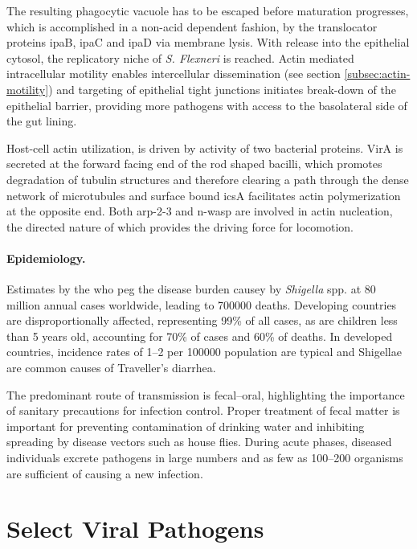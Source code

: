 The resulting phagocytic vacuole has to be escaped before maturation progresses, which is accomplished in a non-acid dependent fashion, by the translocator proteins \gls{ipa}B, \gls{ipa}C and \gls{ipa}D via membrane lysis. With release into the epithelial cytosol, the replicatory niche of \textit{S. Flexneri} is reached. Actin mediated intracellular motility enables intercellular dissemination (see section \ref{subsec:actin-motility}) and targeting of epithelial tight junctions initiates break-down of the epithelial barrier, providing more pathogens with access to the basolateral side of the gut lining.


Host-cell actin utilization, is driven by activity of two bacterial proteins. VirA is secreted at the forward facing end of the rod shaped bacilli, which promotes degradation of tubulin structures and therefore clearing a path through the dense network of microtubules and surface bound \gls{ics}A facilitates actin polymerization at the opposite end. Both \gls{arp-2-3} and \gls{n-wasp} are involved in actin nucleation, the directed nature of which provides the driving force for locomotion.

\paragraph{Epidemiology.}
Estimates by the \gls{who} peg the disease burden causey by \textit{Shigella} spp. at 80 million annual cases worldwide, leading to 700000 deaths. Developing countries are disproportionally affected, representing 99\% of all cases, as are children less than 5 years old, accounting for 70\% of cases and 60\% of deaths. In developed countries, incidence rates of 1--2 per 100000 population are typical and Shigellae are common causes of Traveller's diarrhea.

The predominant route of transmission is fecal--oral, highlighting the importance of sanitary precautions for infection control. Proper treatment of fecal matter is important for preventing contamination of drinking water and inhibiting spreading by disease vectors such as house flies. During acute phases, diseased individuals excrete pathogens in large numbers and as few as 100--200 organisms are sufficient of causing a new infection.

\section{Select Viral Pathogens}

